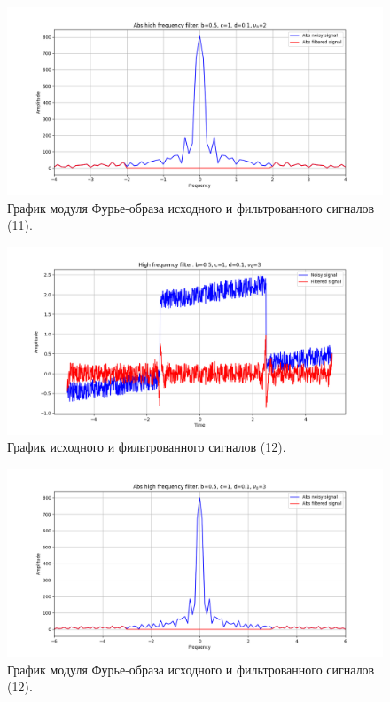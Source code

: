\documentclass[a4paper, 12pt]{article}
\begin{document}
    \begin{figure}[!htb]
        \centering
        \includegraphics[scale=0.48]{11_abs_u_U_nolow.png}
        \captionsetup{skip=0pt}
        \caption{График модуля Фурье-образа исходного и фильтрованного сигналов (11).}
        \label{fig:fig48}
    \end{figure}
    \begin{figure}[!htb]
        \centering
        \includegraphics[scale=0.48]{12_u_flt_u_nolow.png}
        \captionsetup{skip=0pt}
        \caption{График исходного и фильтрованного сигналов (12).}
        \label{fig:fig49}
    \end{figure}
    \newpage
    \begin{figure}[!htb]
        \centering
        \includegraphics[scale=0.48]{12_abs_u_U_nolow.png}
        \captionsetup{skip=0pt}
        \caption{График модуля Фурье-образа исходного и фильтрованного сигналов (12).}
        \label{fig:fig50}
    \end{figure}
\end{document}
